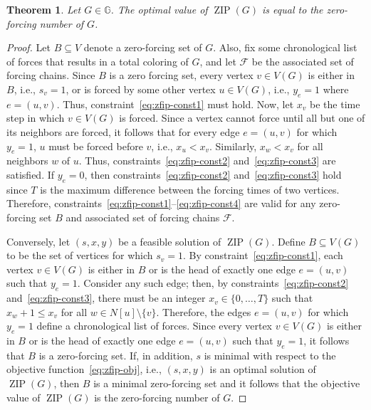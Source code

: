 \documentclass{article}
\newtheorem{theorem}{Theorem}[section]
\theoremstyle{definition}
\newcommand\zip[1]{\operatorname{ZIP}\left(#1\right)}
\begin{document}
\begin{theorem}\label{thm:zfip}
Let $G\in\mathbb{G}$.
The optimal value of $\zip{G}$ is equal to the zero-forcing number of $G$.
\end{theorem}
\begin{proof}
Let $B\subseteq V$ denote a zero-forcing set of $G$.
Also, fix some chronological list of forces that results in a total coloring of $G$, and let $\mathcal{F}$ be the associated set of forcing chains. 
Since $B$ is a zero forcing set, every vertex $v\in V(G)$ is either in $B$, i.e., $s_{v}=1$, or is forced by some other vertex $u\in V(G)$, i.e., $y_{e}=1$ where $e=(u,v)$.
Thus, constraint~\eqref{eq:zfip-const1} must hold.
Now, let $x_{v}$ be the time step in which $v\in V(G)$ is forced. 
Since a vertex cannot force until all but one of its neighbors are forced, it follows that for every edge $e = (u,v)$ for which $y_{e}=1$, $u$ must be forced before $v$, i.e., $x_{u}<x_{v}$. 
Similarly, $x_{w}<x_{v}$ for all neighbors $w$ of $u$. 
Thus, constraints~\eqref{eq:zfip-const2} and~\eqref{eq:zfip-const3} are satisfied.
If $y_{e}=0$, then constraints~\eqref{eq:zfip-const2} and~\eqref{eq:zfip-const3} hold since $T$ is the maximum difference between the forcing times of two vertices. 
Therefore, constraints~\eqref{eq:zfip-const1}--\eqref{eq:zfip-const4} are valid for any zero-forcing set $B$ and associated set of forcing chains $\mathcal{F}$.

Conversely, let $(s,x,y)$ be a feasible solution of $\zip{G}$.
Define $B\subseteq V(G)$ to be the set of vertices for which $s_{v}=1$. 
By constraint~\eqref{eq:zfip-const1}, each vertex $v\in V(G)$ is either in $B$ or is the head of exactly one edge $e = (u,v)$ such that $y_{e}=1$.
Consider any such edge; then, by constraints~\eqref{eq:zfip-const2} and~\eqref{eq:zfip-const3}, there must be an integer $x_{v}\in\{0,\ldots,T\}$ such that $x_{w}+1\leq x_{v}$ for all $w\in N[u]\setminus\{v\}$. 
Therefore, the edges $e=(u,v)$ for which $y_{e}=1$ define a chronological list of forces.
Since every vertex $v\in V(G)$ is either in $B$ or is the head of exactly one edge $e = (u,v)$ such that $y_{e}=1$, it follows that $B$ is a zero-forcing set. 
If, in addition, $s$ is minimal with respect to the objective function~\eqref{eq:zfip-obj}, i.e., $(s,x,y)$ is an optimal solution of $\zip{G}$, then $B$ is a minimal zero-forcing set and it follows that the objective value of $\zip{G}$ is the zero-forcing number of $G$.
\end{proof}
\end{document}
